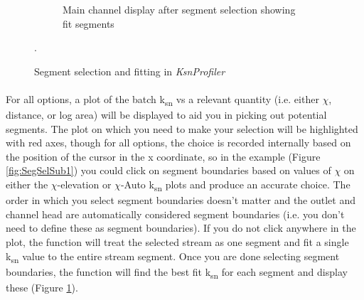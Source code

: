 \begin{figure}[H]
\begin{subfigure}{.5\textwidth}
		\caption{Main channel display after segment selection showing fit segments}
		\label{fig:SegSelSub2}
	\end{subfigure}
	\caption{Segment selection and fitting in \textit{KsnProfiler}}.
	\label{fig:SegSelect}
\end{figure}

\paragraph{}For all options, a plot of the batch k\textsubscript{sn} vs a relevant quantity (i.e. either $\chi$, distance, or log area) will be displayed to aid you in picking out potential segments. The plot on which you need to make your selection will be highlighted with red axes, though for all options, the choice is recorded internally based on the position of the cursor in the x coordinate, so in the example (Figure \ref{fig:SegSelSub1}) you could click on segment boundaries based on values of $\chi$ on either the $\chi$-elevation or $\chi$-Auto k\textsubscript{sn} plots and produce an accurate choice. The order in which you select segment boundaries doesn't matter and the outlet and channel head are automatically considered segment boundaries (i.e. you don't need to define these as segment boundaries). If you do not click anywhere in the plot, the function will treat the selected stream as one segment and fit a single k\textsubscript{sn} value to the entire stream segment. Once you are done selecting segment boundaries, the function will find the best fit k\textsubscript{sn} for each segment and display these (Figure \ref{fig:SegSelSub2}).

